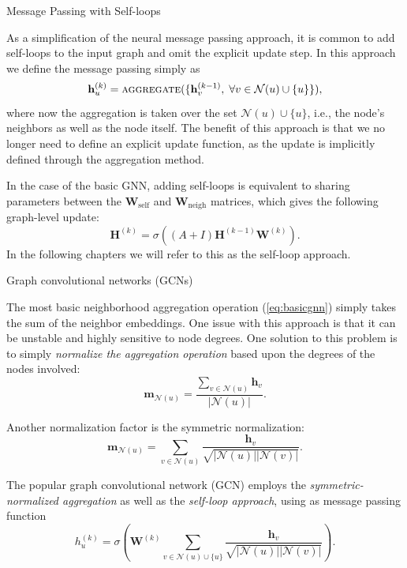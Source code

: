\documentclass[10pt, aspectratio=169, compress, protectframetitle, handout]{beamer}
\begin{document}
\begin{frame}{Message Passing with Self-loops}

    As a simplification of the neural message passing approach, it is common to add self-loops to the input graph and omit the explicit update step. In this approach we define the message passing simply as
    \begin{equation}
        \mathbf h^{(k)}_u = \textsc{aggregate}(\{\mathbf h_v^{(k-1)}, \; \forall v \in \mathcal N(u) \cup \{u\}\}),
    \end{equation}
    where now the aggregation is taken over the set $\mathcal N(u) \cup \{u\}$, i.e., the node’s neighbors as well as the node itself. The benefit of this approach is that we no longer need to define an explicit update function, as the update is implicitly defined through the aggregation method.
    
    In the case of the basic GNN, adding self-loops is equivalent to  sharing parameters between the $\mathbf W_\text{self}$ and $\mathbf W_\text{neigh}$ matrices, which gives the following graph-level update:
    \begin{equation}
        \mathbf H^{(k)} = \sigma \left( (A + I) \mathbf H^{(k-1)} \mathbf W^{(k)} \right) .
    \end{equation}
    In the following chapters we will refer to this as the \alert{self-loop approach}.

\end{frame}


\begin{frame}{Graph convolutional networks (GCNs)}

    The most basic neighborhood aggregation operation (\autoref{eq:basicgnn}) simply takes the sum of the neighbor embeddings. One issue with this approach is that it can be unstable and highly sensitive to node degrees. One solution to this problem is to simply \emph{normalize the aggregation operation} based upon the degrees of the nodes involved:
    \begin{equation}
        \mathbf m_{\mathcal N(u)} = \frac{\sum_{v \in \mathcal N(u)} \mathbf h_v}{|\mathcal N(u)|}.
    \end{equation}
    
    Another normalization factor is the \alert{symmetric normalization}:
    \begin{equation}
        \mathbf m_{\mathcal N(u)} = \sum_{v \in \mathcal N(u)} \frac{\mathbf h_v}{\sqrt{|\mathcal N(u)| |\mathcal N(v)|}}.
    \end{equation}
    
    The popular \alert{graph convolutional network (GCN)} employs the \emph{symmetric-normalized aggregation} as well as the \emph{self-loop approach}, using as message passing function
    \begin{equation}
        h^{(k)}_u = \sigma \left( \mathbf W^{(k)} \sum_{v \in \mathcal N(u) \cup \{u\}} \frac{\mathbf h_v}{\sqrt{|\mathcal N(u)| |\mathcal N(v)|}} \right).
    \end{equation}

\end{frame}
\end{document}
